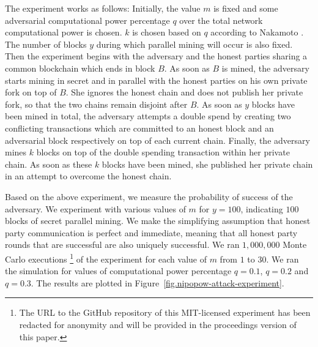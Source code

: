 The experiment works as follows: Initially, the value $m$ is fixed and some
adversarial computational power percentage $q$ over the total network
computational power is chosen. $k$ is chosen based on $q$ according to Nakamoto
\cite{bitcoin}. The number of blocks $y$ during which parallel mining will
occur is also fixed. Then the experiment begins with the adversary and the
honest parties sharing a common blockchain which ends in block $B$. As soon as
$B$ is mined, the adversary starts mining in secret and in parallel with the
honest parties on his own private fork on top of $B$. She ignores the honest
chain and does not publish her private fork, so that the two chains remain
disjoint after $B$. As soon as $y$ blocks have been mined in total, the
adversary attempts a double spend by creating two conflicting transactions
which are committed to an honest block and an adversarial block respectively on
top of each current chain. Finally, the adversary mines $k$ blocks on top of
the double spending transaction within her private chain. As soon as these $k$
blocks have been mined, she published her private chain in an attempt to
overcome the honest chain.

Based on the above experiment, we measure the probability of success of the
adversary. We experiment
with various values of $m$ for $y = 100$, indicating $100$ blocks of secret
parallel mining. We make the simplifying assumption that honest party
communication is perfect and immediate, meaning that all honest party rounds
that are successful are also uniquely successful. We ran $1,000,000$ Monte
Carlo executions \footnote{The URL to the GitHub repository of this
MIT-licensed experiment has been redacted for anonymity and will be provided in
the proceedings version of this paper.} of the experiment for each value of $m$
from $1$ to $30$. We ran the simulation for values of computational power
percentage $q = 0.1$, $q = 0.2$ and $q = 0.3$. The results are plotted in
Figure~\ref{fig.nipopow-attack-experiment}.


